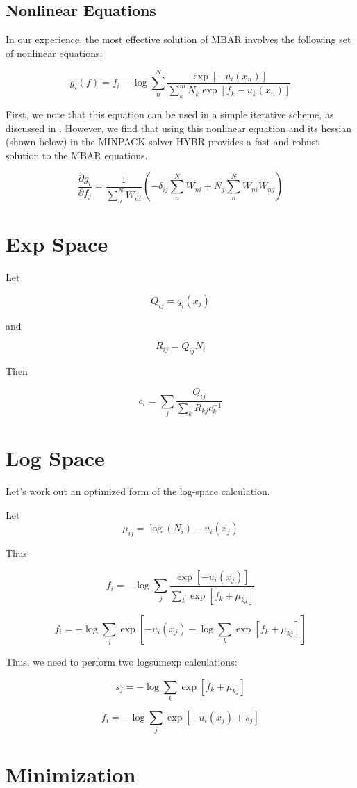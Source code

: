 \documentclass[12pt]{article}
\begin{document}
\subsection{Nonlinear Equations}

In our experience, the most effective solution of MBAR  involves the following set of nonlinear equations:

$$g_i(f) = f_i -\log \sum_n^N \frac{\exp[-u_i(x_n)]}{\sum_k^m N_k \exp[f_k - u_k(x_n)]}$$

First, we note that this equation can be used in a simple iterative scheme, as discussed in \cite{}.  However, we find that using this nonlinear equation and its hessian (shown below) in the MINPACK solver HYBR provides a fast and robust solution to the MBAR equations.

$$\frac{\partial g_i}{\partial f_j} = \frac{1}{\sum_n^N W_{ni}}( - \delta_{ij} \sum_n^N W_{ni} + N_j \sum_n^N W_{ni} W_{nj})$$



\section{Exp Space}

Let

$$Q_{ij} = q_i(x_j)$$

and 

$$R_{ij} = Q_{ij} N_i$$

Then 

$$c_i = \sum_j \frac{Q_{ij}}{\sum_k R_{kj} c_k^{-1}}$$


\section{Log Space}

Let's work out an optimized form of the log-space calculation.  

Let 
$$\mu_{ij} = \log(N_i) -u_i(x_j)$$

Thus

$$f_i = -\log \sum_j \frac{\exp[-u_i(x_j)]}{\sum_k \exp[f_k + \mu_{kj}]}$$

$$f_i = -\log \sum_j \exp[-u_i(x_j) - \log \sum_k \exp[f_k + \mu_{kj}]]$$

Thus, we need to perform two logsumexp calculations:

$$s_j = -\log \sum_k \exp[f_k + \mu_{kj}]$$

$$f_i = -\log \sum_j \exp[-u_i(x_j) + s_j]$$

\section{Minimization}
\end{document}
